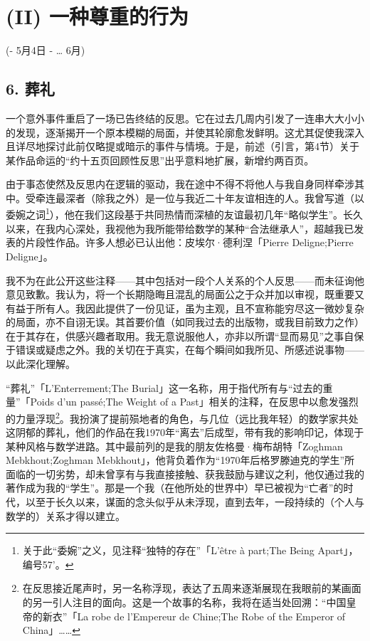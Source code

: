 \section{(II) 一种尊重的行为}

(- 5月4日 - … 6月)

\subsection{6. 葬礼}

一个意外事件重启了一场已告终结的反思。它在过去几周内引发了一连串大大小小的发现，逐渐揭开一个原本模糊的局面，并使其轮廓愈发鲜明。这尤其促使我深入且详尽地探讨此前仅略提或暗示的事件与情境。于是，前述（引言，第4节）关于某作品命运的“约十五页回顾性反思”出乎意料地扩展，新增约两百页。

由于事态使然及反思内在逻辑的驱动，我在途中不得不将他人与我自身同样牵涉其中。受牵连最深者（除我之外）是一位与我近二十年友谊相连的人。我曾写道（以委婉之词\footnote{关于此“委婉”之义，见注释“独特的存在”「L'être à part;The Being Apart」，编号57'。}），他在我们这段基于共同热情而深植的友谊最初几年“略似学生”。长久以来，在我内心深处，我视他为我所能带给数学的某种“合法继承人”，超越我已发表的片段性作品。许多人想必已认出他：皮埃尔·德利涅「Pierre Deligne;Pierre Deligne」。

我不为在此公开这些注释——其中包括对一段个人关系的个人反思——而未征询他意见致歉。我认为，将一个长期隐晦且混乱的局面公之于众并加以审视，既重要又有益于所有人。我因此提供了一份见证，虽为主观，且不宣称能穷尽这一微妙复杂的局面，亦不自诩无误。其首要价值（如同我过去的出版物，或我目前致力之作）在于其存在，供感兴趣者取用。我无意说服他人，亦非以所谓“显而易见”之事自保于错误或疑虑之外。我的关切在于真实，在每个瞬间如我所见、所感述说事物——以此深化理解。

“葬礼”「L'Enterrement;The Burial」这一名称，用于指代所有与“过去的重量”「Poids d'un passé;The Weight of a Past」相关的注释，在反思中以愈发强烈的力量浮现\footnote{在反思接近尾声时，另一名称浮现，表达了五周来逐渐展现在我眼前的某画面的另一引人注目的面向。这是一个故事的名称，我将在适当处回溯：“中国皇帝的新衣”「La robe de l'Empereur de Chine;The Robe of the Emperor of China」……}。我扮演了提前殒地者的角色，与几位（远比我年轻）的数学家共处这阴郁的葬礼，他们的作品在我1970年“离去”后成型，带有我的影响印记，体现于某种风格与数学进路。其中最前列的是我的朋友佐格曼·梅布胡特「Zoghman Mebkhout;Zoghman Mebkhout」，他背负着作为“1970年后格罗滕迪克的学生”所面临的一切劣势，却未曾享有与我直接接触、获我鼓励与建议之利，他仅通过我的著作成为我的“学生”。那是一个我（在他所处的世界中）早已被视为“亡者”的时代，以至于长久以来，谋面的念头似乎从未浮现，直到去年，一段持续的（个人与数学的）关系才得以建立。


